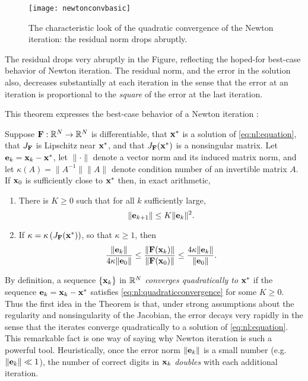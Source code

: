 \begin{figure}
\texttt{[image: newtonconvbasic]}
\caption{The characteristic look of the quadratic convergence of the Newton iteration: the residual norm drops abruptly.}
\label{fig:newtonconvbasic}
\end{figure}

The residual drops very abruptly in the Figure, reflecting the hoped-for best-case behavior of Newton iteration.  The residual norm, and the error in the solution also, decreases substantially at each iteration in the sense that the error at an iteration is proportional to the \emph{square} of the error at the last iteration.

This theorem expresses the best-case behavior of a Newton iteration \citep[Theorems 1.1 and inequalities (1.13)]{Kelley2003}:

\begin{theorem}
Suppose $\mathbf{F}:\mathbb{R}^N\to\mathbb{R}^N$ is differentiable, that $\mathbf{x}^*$ is a solution of \eqref{eq:nl:equation}, that $J_{\mathbf{F}}$ is Lipschitz near $\mathbf{x}^*$, and that $J_{\mathbf{F}}(\mathbf{x}^*)$ is a nonsingular matrix.  Let $\mathbf{e}_k=\mathbf{x}_k-\mathbf{x}^*$, let $\|\cdot\|$ denote a vector norm and its induced matrix norm, and let $\kappa(A)=\|A^{-1}\| \|A\|$ denote condition number of an invertible matrix $A$.  If $\mathbf{x}_0$ is sufficiently close to $\mathbf{x}^*$ then, in exact arithmetic,
\renewcommand{\labelenumi}{(\roman{enumi})}
\begin{enumerate}
\item There is $K\ge 0$ such that for all $k$ sufficiently large,
\begin{equation}
	\|\mathbf{e}_{k+1}\| \le K \|\mathbf{e}_k\|^2. \label{eq:nl:quadraticconvergence}
\end{equation}
\item If $\kappa = \kappa\left(J_{\mathbf{F}}(\mathbf{x}^*)\right)$, so that $\kappa\ge 1$, then
	$$\frac{\|\mathbf{e}_k\|}{4 \kappa \|\mathbf{e}_0\|} \le \frac{\|\mathbf{F}(\mathbf{x}_k)\|}{\|\mathbf{F}(\mathbf{x}_0)\|} \le \frac{4 \kappa \|\mathbf{e}_k\|}{\|\mathbf{e}_0\|}.$$
\end{enumerate}
\end{theorem}

By definition, a sequence $\{\mathbf{x}_k\}$ in $\mathbb{R}^N$ \emph{converges quadratically to} $\mathbf{x}^*$ if the sequence $\mathbf{e}_k=\mathbf{x}_k-\mathbf{x}^*$ satisfies \eqref{eq:nl:quadraticconvergence} for some $K\ge 0$.  Thus the first idea in the Theorem is that, under strong assumptions about the regularity and nonsingularity of the Jacobian, the error decays very rapidly in the sense that the iterates converge quadratically to a solution of \eqref{eq:nl:equation}.  This remarkable fact is one way of saying why Newton iteration is such a powerful tool.  Heuristically, once the error norm $\|\mathbf{e}_k\|$ is a small number (e.g.~$\|\mathbf{e}_k\| \ll 1$), the number of correct digits in $\mathbf{x}_k$ \emph{doubles} with each additional iteration.

